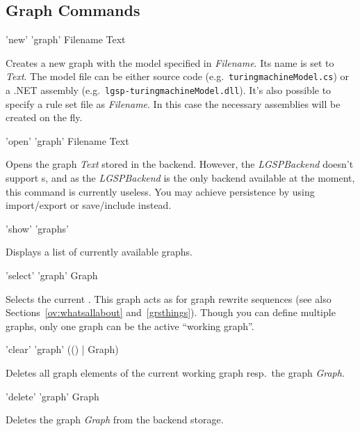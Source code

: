 \subsection{Graph Commands}
\label{graphcommands}

\begin{rail}
  'new' 'graph' Filename Text 
\end{rail}
Creates a new graph with the model specified in \emph{Filename}.
Its name is set to \emph{Text}. 
The model file can be either source code (e.g.\ \texttt{turing\textunderscore machineModel.cs}) or a .NET assembly (e.g.\ \texttt{lgsp-turing\textunderscore machineModel.dll}).
It's also possible to specify a rule set file as \emph{Filename}. 
In this case the necessary assemblies will be created on the fly.

\begin{rail}
  'open' 'graph' Filename Text
\end{rail}
Opens the graph \emph{Text} stored in the backend. 
However, the \emph{LGSPBackend} doesn't support s, and as the \emph{LGSPBackend} is the only backend available at the moment, this command is currently useless.
You may achieve persistence by using import/export or save/include instead.

\begin{rail}
  'show' 'graphs'
\end{rail}
Displays a list of currently available graphs.

\begin{rail}
  'select' 'graph' Graph
\end{rail}
Selects the current .
This graph acts as \emph{} for graph rewrite sequences (see also Sections~\ref{ov:whatsallabout} and~\ref{grsthings}).
Though you can define multiple graphs, only one graph can be the active ``working graph''.

\begin{rail}
  'clear' 'graph' (() | Graph)
\end{rail}
Deletes all graph elements of the current working graph resp.\ the graph \emph{Graph}.

\begin{rail}
  'delete' 'graph' Graph
\end{rail}
Deletes the graph \emph{Graph} from the backend storage.

